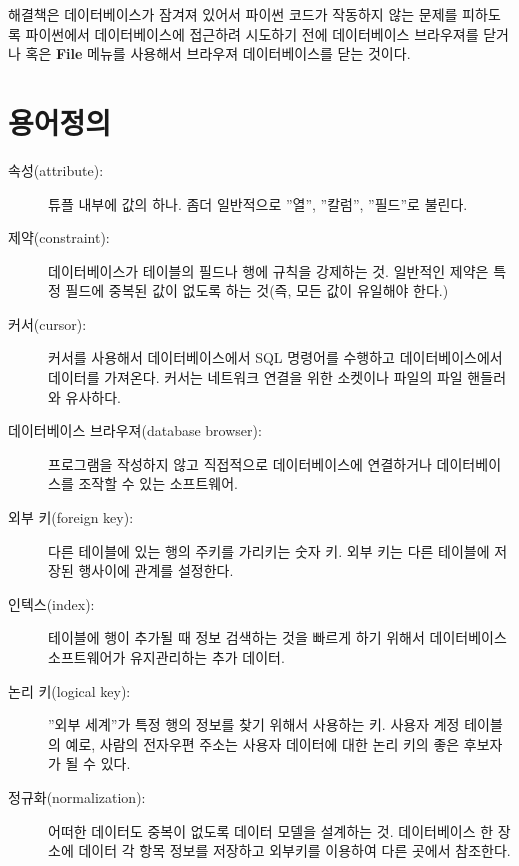 해결책은 데이터베이스가 잠겨져 있어서 파이썬 코드가 작동하지 않는 문제를 피하도록 
파이썬에서 데이터베이스에 접근하려 시도하기 전에 데이터베이스 브라우져를 닫거나 혹은 {\bf File} 메뉴를 사용해서 브라우져 데이터베이스를 닫는 것이다.

\section{용어정의}

\begin{description}

\item[속성(attribute):] 튜플 내부에 값의 하나. 좀더 일반적으로 ''열'', ''칼럼'', ''필드''로 불린다.

\item[제약(constraint):] 
데이터베이스가 테이블의 필드나 행에 규칙을 강제하는 것.
일반적인 제약은 특정 필드에 중복된 값이 없도록 하는 것(즉, 모든 값이 유일해야 한다.)

\item[커서(cursor):]
커서를 사용해서 데이터베이스에서 SQL 명령어를 수행하고 데이터베이스에서 데이터를 가져온다.
커서는 네트워크 연결을 위한 소켓이나 파일의 파일 핸들러와 유사하다.

\item[데이터베이스 브라우져(database browser):] 
프로그램을 작성하지 않고 직접적으로 데이터베이스에 연결하거나 데이터베이스를 조작할 수 있는 소프트웨어.

\item[외부 키(foreign key):]
다른 테이블에 있는 행의 주키를 가리키는 숫자 키.
외부 키는 다른 테이블에 저장된 행사이에 관계를 설정한다.

\item[인텍스(index):]
테이블에 행이 추가될 때 정보 검색하는 것을 빠르게 하기 위해서 데이터베이스 소프트웨어가 유지관리하는 추가 데이터.

\item[논리 키(logical key):]
''외부 세계''가 특정 행의 정보를 찾기 위해서 사용하는 키. 
사용자 계정 테이블의 예로,
사람의 전자우편 주소는 사용자 데이터에 대한 논리 키의 좋은 후보자가 될 수 있다.

\item[정규화(normalization):]
어떠한 데이터도 중복이 없도록 데이터 모델을 설계하는 것.
데이터베이스 한 장소에 데이터 각 항목 정보를 저장하고 외부키를 이용하여 다른 곳에서 참조한다.


\end{description}
